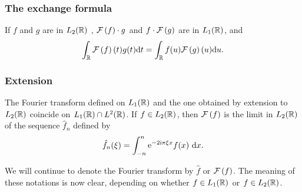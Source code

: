 \begin{frame}
\frametitle{The exchange formula}
\begin{theorem}
If $f$ and $g$  are in $L_2(\mathbb{R})$ , $\mathcal{F}\left( f \right) \cdot g$ and $f\cdot \mathcal{F}\left( g \right)$ are in $L_1(\mathbb{R})$, and
$$
\int_{\mathbb{R}} \mathcal{F}\left( f \right)(t)g(t) \mathrm{d} t=\int_{\mathbb{R}} f(u) \mathcal{F}\left( g \right)(u) \mathrm{d} u.
$$
\end{theorem}
\end{frame}



\begin{frame}
\frametitle{Extension}
\begin{theorem}
The Fourier transform defined on $L_1(\mathbb{R})$  and the one obtained by extension to $L_2(\mathbb{R})$  coincide on $L_1(\mathbb{R})\cap L^{2}(\mathbb{R})$. If $ f\in L_2(\mathbb{R})$,  then $\mathcal{F}\left( f \right)$  is the limit in $L_2(\mathbb{R})$  of the sequence $\hat{f}_{n}$ defined by
$$
\hat{f}_{n}(\xi)=\int_{-n}^{n} \mathrm{e}^{-2\mathrm{i} \pi\xi x}f(x)\ \mathrm{d} x.
$$
\end{theorem}
We will continue to denote the Fourier transform by $\hat{f}$ or $\mathcal{F}\left( f \right)$. The meaning of these notations is now clear, depending on whether $ f\in L_1(\mathbb{R})$ or $ f\in L_2(\mathbb{R})$.
\end{frame}

